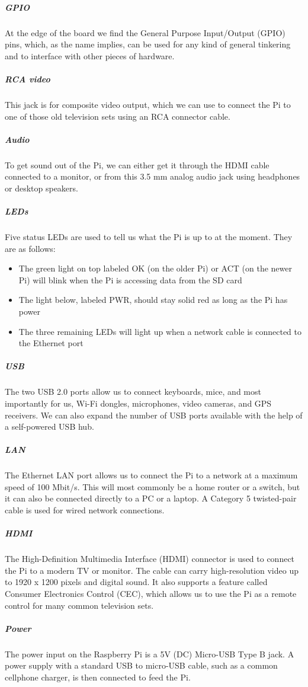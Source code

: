 \subparagraph*{GPIO}
\hfill \break
At the edge of the board we find the General Purpose Input/Output (GPIO) pins,
which, as the name implies, can be used for any kind of general tinkering and to
interface with other pieces of hardware.

\subparagraph*{RCA video}
\hfill \break
This jack is for composite video output, which we can use to connect the Pi to one of
those old television sets using an RCA connector cable.

\subparagraph*{Audio}
\hfill \break
To get sound out of the Pi, we can either get it through the HDMI cable connected
to a monitor, or from this 3.5 mm analog audio jack using headphones or
desktop speakers.

\subparagraph*{LEDs}
\hfill \break
Five status LEDs are used to tell us what the Pi is up to at the moment. They are
as follows:
\begin{itemize}
  \item The green light on top labeled OK (on the older Pi) or ACT (on the newer Pi)
will blink when the Pi is accessing data from the SD card
  \item The light below, labeled PWR, should stay solid red as long as the Pi
has power
  \item The three remaining LEDs will light up when a network cable is connected
to the Ethernet port
\end{itemize}

\subparagraph*{USB}
\hfill \break
The two USB 2.0 ports allow us to connect keyboards, mice, and most importantly
for us, Wi-Fi dongles, microphones, video cameras, and GPS receivers. We can also
expand the number of USB ports available with the help of a self-powered USB hub.

\subparagraph*{LAN}
\hfill \break
The Ethernet LAN port allows us to connect the Pi to a network at a maximum speed
of 100 Mbit/s. This will most commonly be a home router or a switch, but it can also
be connected directly to a PC or a laptop. A Category 5 twisted-pair cable is used for
wired network connections.

\subparagraph*{HDMI}
\hfill \break
The High-Definition Multimedia Interface (HDMI) connector is used to connect the
Pi to a modern TV or monitor. The cable can carry high-resolution video up to 1920 x
1200 pixels and digital sound. It also supports a feature called Consumer Electronics
Control (CEC), which allows us to use the Pi as a remote control for many common
television sets.

\subparagraph*{Power}
\hfill \break
The power input on the Raspberry Pi is a 5V (DC) Micro-USB Type B jack. A power
supply with a standard USB to micro-USB cable, such as a common cellphone
charger, is then connected to feed the Pi.

